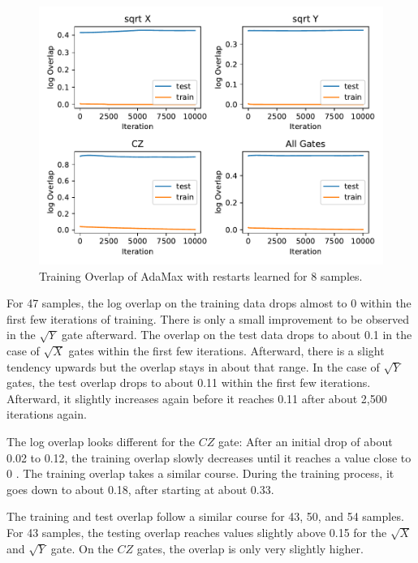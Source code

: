 \begin{figure}[H]
  \centering
  \includegraphics[width=\textwidth]{figures/results/AM-restarts-learned/avgOverlap_8.pdf}
  \caption[Training overlap of AdaMax with restarts learned]{Training 
  Overlap of AdaMax with restarts learned for 8 samples.}
  \label{fig:am_overlap_8}
\end{figure}

For 47 samples, the log overlap on the training data drops almost to 0 within the first few iterations 
of training. There is only a small improvement to be observed in the $\sqrt{Y}$ gate afterward. 
The overlap on the test data drops to about 0.1 in the case of $\sqrt{X}$ gates within the first few iterations.
Afterward, there is a slight tendency upwards but the overlap stays in about that range. In the case 
of $\sqrt{Y}$ gates, the test overlap drops to about 0.11 within the first few iterations. Afterward, 
it slightly increases again before it reaches 0.11 after about 2,500 iterations again.

The log overlap looks different for the $CZ$ gate: After an initial drop of about 0.02 to 0.12, the 
training overlap slowly decreases until it reaches a value close to 0 . The 
training overlap takes a similar course. During the training process, it goes down to about 0.18, after 
starting at about 0.33.

The training and test overlap follow a similar course for 43, 50, and 54 samples. For 43 samples, the 
testing overlap reaches values slightly above 0.15 for the $\sqrt{X}$ and $\sqrt{Y}$ gate. On the $CZ$ gates, 
the overlap is only very slightly higher.

